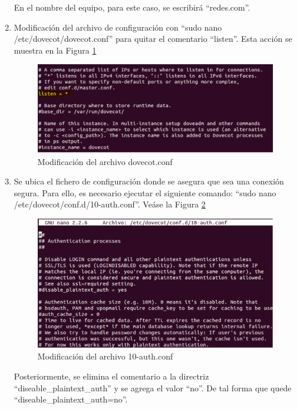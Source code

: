 \begin{enumerate}
    En el nombre del equipo, para este caso, se escribirá ``redes.com''.
    
    \item Modificación del archivo de configuración con “sudo nano /etc/dovecot/dovecot.conf” para quitar el comentario “listen”. Esta acción se muestra en la Figura \ref{fig:smtp13}
    
    \begin{figure}[H]
        \centering
        \includegraphics[scale=1.13]{imagenes/primero/paso13_smtp.PNG}
        \caption{Modificación del archivo dovecot.conf}
        \label{fig:smtp13}
    \end{figure}
    
    \item Se ubica el fichero de configuración donde se asegura que sea una conexión segura. Para ello, es necesario ejecutar el siguiente comando: ``sudo nano /etc/dovecot/conf.d/10-auth.conf''. Veáse la Figura \ref{fig:smtp14}
    
    \begin{figure}[H]
        \centering
        \includegraphics[scale=.95]{imagenes/primero/paso14_smtp.PNG}
        \caption{Modificación del archivo 10-auth.conf}
        \label{fig:smtp14}
    \end{figure}
    
    \noindent
    Posteriormente, se elimina el comentario a la directriz ``diseable\_plaintext\_auth'' y se agrega el valor ``no''. De tal forma que quede ``diseable\_plaintext\_auth=no''.\\
    

\end{enumerate}
